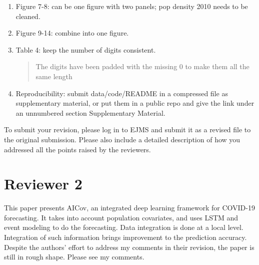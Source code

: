 \begin{enumerate}
\item \DOIT  Figure 7-8: can be one figure with two panels; pop density 2010 needs to be cleaned.

\begin{quote}
\end{quote}

\item \DOIT  Figure 9-14: combine into one figure.

\begin{quote}
\end{quote}

\item \DONE  Table 4: keep the number of digits consistent.

\begin{quote}
    The digits have been padded with the missing 0 to make them all the same length
\end{quote}

\item \DOIT  Reproducibility: submit data/code/README in a compressed file as supplementary material, or put them in a public repo and give the link under an unnumbered section Supplementary Material.

\begin{quote}
\end{quote}

\end{enumerate}

To submit your revision, please log in to EJMS and submit it as a revised file to the original submission. Please also include a detailed description of how you addressed all the points raised by the reviewers.

\section*{Reviewer 2}

This paper presents AICov, an integrated deep learning framework for COVID-19 forecasting. It takes into account population covariates, and uses LSTM and event modeling to do the forecasting. Data integration is done at a local level. Integration of such information brings improvement to the prediction accuracy. Despite the authors’ effort to address my comments in their revision, the paper is still in rough shape. Please see my comments.

